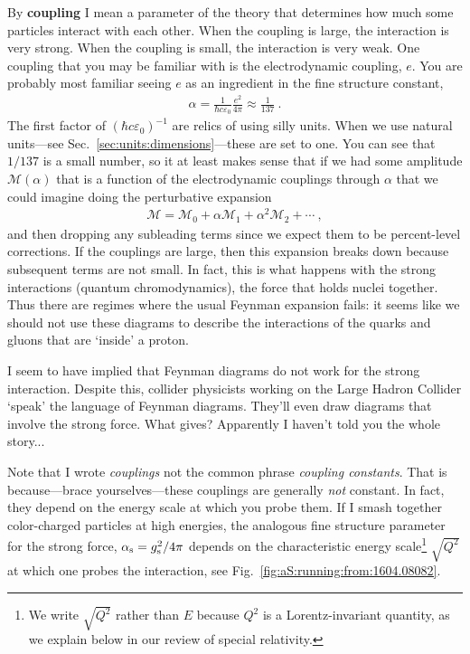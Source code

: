\documentclass[12pt, oneside]{report}    %
\begin{document}
By \textbf{coupling} I mean a parameter of the theory that determines how much some particles interact with each other. When the coupling is large, the interaction is very strong. When the coupling is small, the interaction is very weak. One coupling that you may be familiar with is the electrodynamic coupling, $e$. You are probably most familiar seeing $e$ as an ingredient in the fine structure constant, 
\begin{align}
    \alpha = \frac{1}{\hbar c \varepsilon_0} \frac{e^2}{4\pi} \approx \frac{1}{137} \ .
\end{align}
The first factor of $(\hbar c \varepsilon_0)^{-1}$ are relics of using silly units. When we use natural units---see Sec.~\ref{sec:units:dimensions}---these are set to one. You can see that $1/137$ is a small number, so it at least makes sense that if we had some amplitude $\mathcal M(\alpha)$ that is a function of the electrodynamic couplings through $\alpha$ that we could imagine doing the perturbative expansion
\begin{align}
    \mathcal M = \mathcal M_0 + \alpha \mathcal M_1  + \alpha^2 \mathcal M_2 + \cdots \ ,
    \label{eq:amplitude:perturbative:expansion}
\end{align}
and then dropping any subleading terms since we expect them to be percent-level corrections. If the couplings are large, then this expansion breaks down because subsequent terms are not small. In fact, this is what happens with the strong interactions (quantum chromodynamics), the force that holds nuclei together. Thus there are regimes where the usual Feynman expansion fails: it seems like we should not use these diagrams to describe the interactions of the quarks and gluons that are `inside' a proton.
\begin{example}
I seem to have implied that Feynman diagrams do not work for the strong interaction. Despite this, collider physicists working on the Large Hadron Collider `speak' the language of Feynman diagrams. They'll even draw diagrams that involve the strong force. What gives? Apparently I haven't told you the whole story...
\end{example}
Note that I wrote \emph{couplings} not the common phrase \emph{coupling constants}. That is because---brace yourselves---these couplings are generally \emph{not} constant. In fact, they depend on the energy scale at which you probe them. If I smash together color-charged particles at high energies, the analogous fine structure parameter for the strong force, $\alpha_\textnormal{s} = g_\textnormal{s}^2/4\pi$ depends on the characteristic energy scale\footnote{We write $\sqrt{Q^2}$ rather than $E$ because $Q^2$ is a Lorentz-invariant quantity, as we explain below in our review of special relativity.} $\sqrt{Q^2}$ at which one probes the interaction, see Fig.~\ref{fig:aS:running:from:1604.08082}. 
\end{document}
